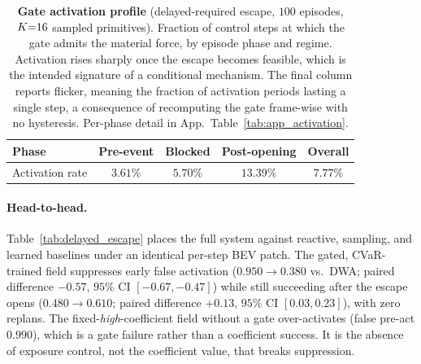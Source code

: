 \begin{table}[t]
\centering
\caption{\textbf{Gate activation profile} (delayed-required escape, $100$
episodes, $K{=}16$ sampled primitives). Fraction of control steps at which
the gate admits the material force, by episode phase and regime. Activation
rises sharply once the escape becomes feasible, which is the intended signature
of a conditional mechanism. The final column reports flicker, meaning the fraction of
activation periods lasting a single step, a consequence of recomputing the gate
frame-wise with no hysteresis. Per-phase detail in
App.~Table~\ref{tab:app_activation}.}
\label{tab:activation_profile}
\small
\setlength{\tabcolsep}{8pt}\renewcommand{\arraystretch}{1.1}
\begin{tabular}{lcccc}
\toprule
Phase & Pre-event & Blocked & Post-opening & Overall \\
\midrule
Activation rate & $3.61\%$ & $5.70\%$ & $13.39\%$ & $7.77\%$ \\
\bottomrule
\end{tabular}
\end{table}

\paragraph{Head-to-head.}
Table~\ref{tab:delayed_escape} places the full system against reactive, sampling, and learned baselines under an identical per-step BEV patch. The gated, CVaR-trained field suppresses early false activation ($0.950\!\to\!0.380$ vs.\ DWA; paired difference $-0.57$, $95\%$ CI $[-0.67,-0.47]$) while still succeeding after the escape opens ($0.480\!\to\!0.610$; paired difference $+0.13$, $95\%$ CI $[0.03,0.23]$), with zero replans. The fixed-\emph{high}-coefficient field without a gate over-activates (false pre-act $0.990$), which is a gate failure rather than a coefficient success. It is the absence of exposure control, not the coefficient value, that breaks suppression.

